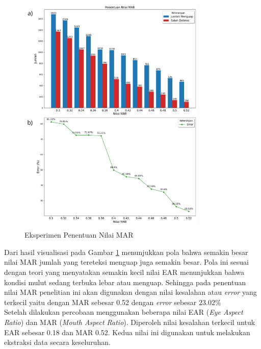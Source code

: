          \begin{figure}[H]
               \centering
               \includegraphics[width=0.8\textwidth]{figures/bab4/penentuan nilai mar.png}
               \caption{Eksperimen Penentuan Nilai MAR}
               \label{Eksperimen Penentuan Nilai MAR}

         \end{figure}

        Dari hasil visualisasi pada Gambar \ref{Eksperimen Penentuan Nilai MAR} menunjukkan pola bahwa semakin besar nilai MAR jumlah yang tereteksi 
        menguap juga semakin besar. Pola ini sesuai dengan teori yang menyatakan 
        semakin kecil nilai EAR menunjukkan bahwa kondisi mulut sedang terbuka lebar atau menguap. Sehingga pada penentuan nilai MAR penelitian ini akan digunakan dengan nilai kesalahan atau \textit{error} yang terkecil yaitu dengan MAR sebesar 0.52 dengan \textit{error} sebesar $23.02\%$\\



    Setelah dilakukan percobaan menggunakan beberapa nilai EAR (\textit{Eye Aspect Ratio}) dan MAR (\textit{Mouth Aspect Ratio}). Diperoleh nilai kesalahan terkecil untuk EAR sebesar 0.18 dan MAR 0.52. Kedua nilai ini digunakan untuk melakukan ekstraksi data secara keseluruhan.
    
